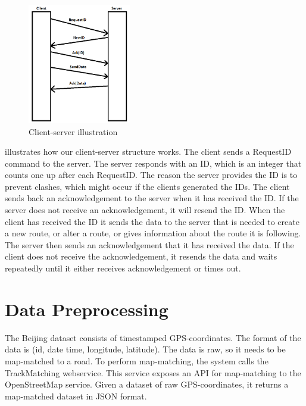 \begin{figure}[h!]
  \centering
    \includegraphics[width=0.4\textwidth]{figures/clientserver.png}
    \caption{Client-server illustration}
    \label{fig:clientserver}
\end{figure}

 illustrates how our client-server structure works. The client sends a RequestID command to the server. The server responds with an ID, which is an integer that counts one up after each RequestID. The reason the server provides the ID is to prevent clashes, which might occur if the clients generated the IDs. The client sends back an acknowledgement to the server when it has received the ID. If the server does not receive an acknowledgement, it will resend the ID. When the client has received the ID it sends the data to the server that is needed to create a new route, or alter a route, or gives information about the route it is following. The server then sends an acknowledgement that it has received the data. If the client does not receive the acknowledgement, it resends the data and waits repeatedly until it either receives acknowledgement or times out.

\section{Data Preprocessing}
The Beijing dataset consists of timestamped GPS-coordinates. The format of the data is (id, date time, longitude, latitude). The data is raw, so it needs to be map-matched to a road. To perform map-matching, the system calls the TrackMatching webservice\cite{TrackMatching}. This service exposes an API for map-matching to the OpenStreetMap service. Given a dataset of raw GPS-coordinates, it returns a map-matched dataset in JSON format.
